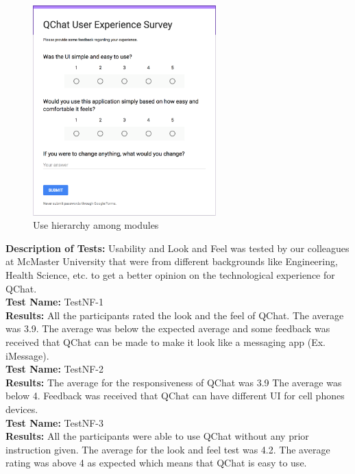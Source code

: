 \documentclass[12pt, titlepage]{article}
\begin{document}
\begin{figure}[H]
\centering
\includegraphics[width=0.63\textwidth]{Survey.png}
\caption{Use hierarchy among modules}
\label{FigUH}
\end{figure}


\textbf{Description  of Tests:} Usability and Look and Feel was tested by our colleagues at McMaster University that were from different backgrounds like Engineering, Health Science, etc. to get a better opinion on the technological experience for QChat. 	\\

\noindent\textbf{Test Name:} TestNF-1\\
\textbf{Results:} All the participants rated the look and the feel of QChat. The average was 3.9. The average was below the expected average and some feedback was received that QChat can be made to make it look like a messaging app (Ex. iMessage). \\

\noindent\textbf{Test Name:} TestNF-2\\
\textbf{Results:} The average for the responsiveness of QChat was 3.9  The average was below 4. Feedback was received that QChat can have different UI for cell phones devices. \\

\noindent\textbf{Test Name:} TestNF-3\\
\textbf{Results:} All the participants were able to use QChat without any prior instruction given. The average for the look and feel test was 4.2. The average rating was above 4 as expected which means that QChat is easy to use.  \\
\end{document}
